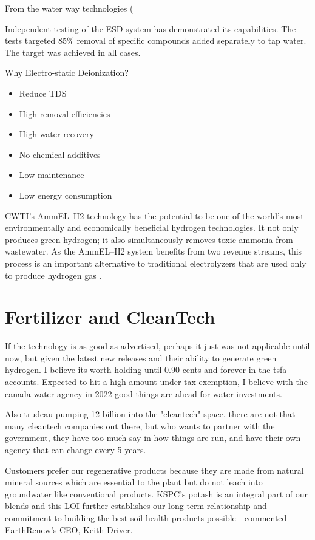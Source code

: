 From the water way technologies (

Independent testing of the ESD system has demonstrated its capabilities. The tests targeted 85\% removal of specific compounds added separately to tap water. The target was achieved in all cases. \cite{cwti_esd}

Why Electro-static Deionization? 
\begin{itemize}
    \item Reduce TDS
    \item High removal efficiencies
    \item High water recovery
    \item No chemical additives
    \item Low maintenance
    \item Low energy consumption
\end{itemize}


\begin{blockquote}
CWTI’s AmmEL–H2 technology has the potential to be one of the world’s most environmentally and economically beneficial hydrogen technologies. It not only produces green hydrogen; it also simultaneously removes toxic ammonia from wastewater. As the AmmEL–H2 system benefits from two revenue streams, this process is an important alternative to traditional electrolyzers that are used only to produce hydrogen gas \cite{ctwi_green_hydrogen}.
\end{blockquote}

\section{Fertilizer and CleanTech}

If the technology is as good as advertised, perhaps it just was not applicable until now, but given the latest new releases and their ability to generate green hydrogen. I believe its worth holding until 0.90 cents and forever in the tsfa accounts. Expected to hit a high amount under tax exemption, I believe with the canada water agency in 2022 good things are ahead for water investments.

Also trudeau pumping 12 billion into the "cleantech" space, there are not that many cleantech companies out there, but who wants to partner with the government, they have too much say in how things are run, and have their own agency that can change every 5 years.


 \begin{displayquote}
Customers prefer our regenerative products because they are made from natural mineral sources which are essential to the plant but do not leach into groundwater like conventional products. KSPC’s potash is an integral part of our blends and this LOI further establishes our long-term relationship and commitment to building the best soil health products possible - commented EarthRenew’s CEO, Keith Driver.
    \end{displayquote}
    

